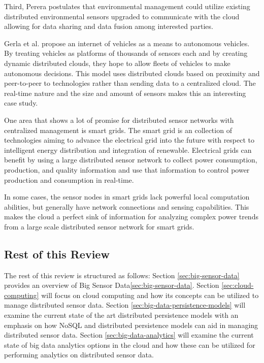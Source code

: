 \documentclass[]{article}
\begin{document}
Third, Perera postulates that environmental management could utilize existing distributed environmental sensors upgraded to communicate with the cloud allowing for data sharing and data fusion among interested parties.

Gerla et al.\cite{gerla_internet_2014} propose an internet of vehicles as a means to autonomous vehicles. By treating vehicles as platforms of thousands of sensors each and by creating dynamic distributed clouds, they hope to allow fleets of vehicles to make autonomous decisions. This model uses distributed clouds based on proximity and peer-to-peer to technologies rather than sending data to a centralized cloud. The real-time nature and the size and amount of sensors makes this an interesting case study.

One area that shows a lot of promise for distributed sensor networks with centralized management is smart grids. The smart grid is an collection of technologies aiming to advance the electrical grid into the future with respect to intelligent energy distribution and integration of renewable. Electrical grids can benefit by using a large distributed sensor network to collect power consumption, production, and quality information and use that information to control power production and consumption in real-time. 

In some cases, the sensor nodes in smart grids lack powerful local computation abilities, but generally have network connections and sensing capabilities. This makes the cloud a perfect sink of information for analyzing complex power trends from a large scale distributed sensor network for smart grids\cite{botta_integration_2016}.

\subsection{Rest of this Review} \label{ssec:rest-of-this-review}
The rest of this review is structured as follows: Section \ref{sec:big-sensor-data} provides an overview of Big Sensor Data\ref{sec:big-sensor-data}. Section \ref{sec:cloud-computing} will focus on cloud computing and how its concepts can be utilized to manage distributed sensor data. Section \ref{sec:big-data-persistence-models} will examine the current state of the art distributed persistence models with an emphasis on how NoSQL and distributed persistence models can aid in managing distributed sensor data. Section \ref{sec:big-data-analytics} will examine the current state of big data analytics options in the cloud and how these can be utilized for performing analytics on distributed sensor data.
\end{document}
